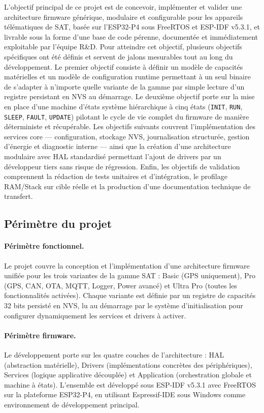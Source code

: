 L'objectif principal de ce projet est de concevoir, implémenter et
valider une architecture firmware générique, modulaire et configurable
pour les appareils télématiques de SAT, basée sur l'ESP32-P4 sous
FreeRTOS et ESP-IDF v5.3.1, et livrable sous la forme d'une base de
code pérenne, documentée et immédiatement exploitable par l'équipe
R\&D. Pour atteindre cet objectif, plusieurs objectifs spécifiques
ont été définis et servent de jalons mesurables tout au long du
développement. Le premier objectif consiste à définir un modèle de
capacités matérielles et un modèle de configuration runtime permettant
à un seul binaire de s'adapter à n'importe quelle variante de la gamme
par simple lecture d'un registre persistant en NVS au démarrage. Le
deuxième objectif porte sur la mise en place d'une machine d'états
système hiérarchique à cinq états (\texttt{INIT}, \texttt{RUN},
\texttt{SLEEP}, \texttt{FAULT}, \texttt{UPDATE}) pilotant le cycle
de vie complet du firmware de manière déterministe et récupérable.
Les objectifs suivants couvrent l'implémentation des services core
--- configuration, stockage NVS, journalisation structurée, gestion
d'énergie et diagnostic interne --- ainsi que la création d'une
architecture modulaire avec HAL standardisé permettant l'ajout de
drivers par un développeur tiers sans risque de régression. Enfin,
les objectifs de validation comprennent la rédaction de tests
unitaires et d'intégration, le profilage RAM/Stack sur cible réelle
et la production d'une documentation technique de transfert.

\subsection{Périmètre du projet}
\label{subsec:perimetre}

\paragraph{Périmètre fonctionnel.}
Le projet couvre la conception et l'implémentation d'une architecture
firmware unifiée pour les trois variantes de la gamme SAT : Basic
(GPS uniquement), Pro (GPS, CAN, OTA, MQTT, Logger, Power avancé) et
Ultra Pro (toutes les fonctionnalités activées). Chaque variante est
définie par un registre de capacités 32 bits persisté en NVS, lu au
démarrage par le système d'initialisation pour configurer dynamiquement
les services et drivers à activer.

\paragraph{Périmètre firmware.}
Le développement porte sur les quatre couches de l'architecture :
HAL (abstraction matérielle), Drivers (implémentations concrètes des
périphériques), Services (logique applicative découplée) et Application
(orchestration globale et machine à états). L'ensemble est développé
sous ESP-IDF v5.3.1 avec FreeRTOS sur la plateforme ESP32-P4, en
utilisant Espressif-IDE sous Windows comme environnement de
développement principal.

